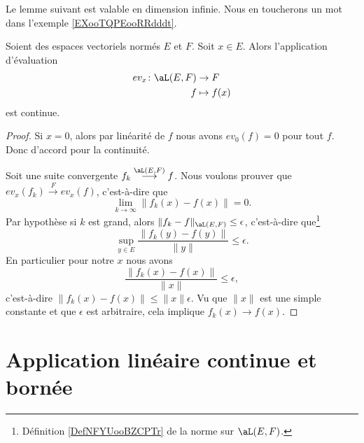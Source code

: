 Le lemme suivant est valable en dimension infinie. Nous en toucherons un mot dans l'exemple \ref{EXooTQPEooRRdddt}.
\begin{lemma}       \label{LEMooWFNXooLyTyyX}
	Soient des espaces vectoriels normés \( E\) et \( F\). Soit \( x\in E\). Alors l'application d'évaluation
	\begin{equation}
		\begin{aligned}
			ev_x\colon \aL(E,F) & \to F        \\
			f                   & \mapsto f(x)
		\end{aligned}
	\end{equation}
	est continue.
\end{lemma}

\begin{proof}
	Si \( x=0\), alors par linéarité de \( f\) nous avons \( ev_0(f)=0\) pour tout \( f\). Donc d'accord pour la continuité.

	Soit une suite convergente \( f_k\stackrel{\aL(E,F)}{\longrightarrow}f\). Nous voulons prouver que \( ev_x(f_k)\stackrel{F}{\longrightarrow}ev_x(f)\), c'est-à-dire que
	\begin{equation}
		\lim_{k\to \infty} \| f_k(x)-f(x) \|=0.
	\end{equation}
	Par hypothèse si \( k\) est grand, alors \( \| f_k-f  \|_{\aL(E,F)}\leq \epsilon\), c'est-à-dire que\footnote{Définition \ref{DefNFYUooBZCPTr} de la norme sur \( \aL(E,F)\).}
	\begin{equation}
		\sup_{y\in E}\frac{ \| f_k(y)-f(y) \| }{ \| y \| }\leq \epsilon.
	\end{equation}
	En particulier pour notre \( x\) nous avons
	\begin{equation}
		\frac{ \| f_k(x)-f(x) \| }{ \| x \| }\leq \epsilon,
	\end{equation}
	c'est-à-dire \( \| f_k(x)-f(x) \|\leq \| x \|\epsilon\). Vu que \( \| x \|\) est une simple constante et que \( \epsilon\) est arbitraire, cela implique \( f_k(x)\to f(x)\).
\end{proof}


\section{Application linéaire continue et bornée}

